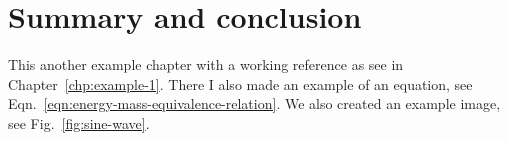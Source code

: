 \documentclass[\main/master.tex]{subfiles}
\begin{document}
\chapter{Summary and conclusion}\label{chp:example-2}
\doublespacing
\hspace{5 mm} This another example chapter with a working reference as see in Chapter~\ref{chp:example-1}. There I also made an example of an equation, see Eqn.~\ref{eqn:energy-mass-equivalence-relation}. We also created an example image, see Fig.~\ref{fig:sine-wave}.
\end{document}
